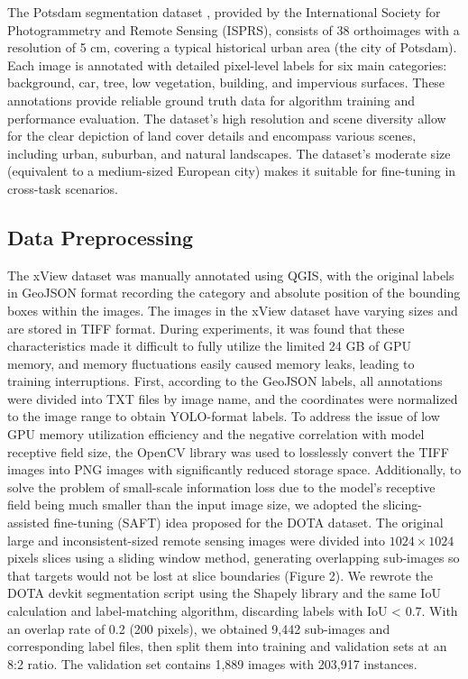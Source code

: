 \documentclass{article}
\begin{document}
The Potsdam segmentation dataset \cite{isprs2018benchmark}, provided by the International 
Society for Photogrammetry and Remote Sensing (ISPRS), consists of 
38 orthoimages with a resolution of 5 cm, covering a typical historical 
urban area (the city of Potsdam). Each image is annotated with detailed 
pixel-level labels for six main categories: background, car, tree, 
low vegetation, building, and impervious surfaces. These annotations 
provide reliable ground truth data for algorithm training and performance 
evaluation. The dataset's high resolution and scene diversity allow 
for the clear depiction of land cover details and encompass various 
scenes, including urban, suburban, and natural landscapes. The dataset's 
moderate size (equivalent to a medium-sized European city) makes it 
suitable for fine-tuning in cross-task scenarios.

\subsection{Data Preprocessing}
The xView dataset was manually annotated using QGIS, with the original 
labels in GeoJSON format recording the category and absolute position 
of the bounding boxes within the images. The images in the xView dataset 
have varying sizes and are stored in TIFF format. During experiments, 
it was found that these characteristics made it difficult to fully utilize 
the limited 24 GB of GPU memory, and memory fluctuations easily caused 
memory leaks, leading to training interruptions. First, according to 
the GeoJSON labels, all annotations were divided into TXT files by 
image name, and the coordinates were normalized to the image range 
to obtain YOLO-format labels. To address the issue of low GPU memory 
utilization efficiency and the negative correlation with model 
receptive field size, the OpenCV library was used to losslessly convert 
the TIFF images into PNG images with significantly reduced storage space. 
Additionally, to solve the problem of small-scale information loss due 
to the model's receptive field being much smaller than the input image 
size, we adopted the slicing-assisted fine-tuning (SAFT) idea proposed 
for the DOTA dataset. The original large and inconsistent-sized remote 
sensing images were divided into $1024 \times 1024$ pixels slices using a 
sliding window method, generating overlapping sub-images so that targets 
would not be lost at slice boundaries (Figure 2). We rewrote the DOTA 
devkit segmentation script using the Shapely library and the same IoU 
calculation and label-matching algorithm, discarding labels with IoU < 0.7. 
With an overlap rate of 0.2 (200 pixels), we obtained 9,442 sub-images and 
corresponding label files, then split them into training and validation 
sets at an 8:2 ratio. The validation set contains 1,889 images with 
203,917 instances.
\end{document}
